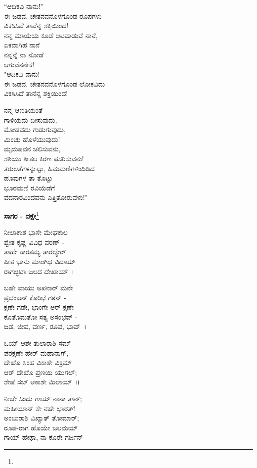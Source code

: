 “ಆದಿಕವಿ ನಾನು!”\\ಈ ಜಡವ, ಚೇತನವನೊಳಗೊಂಡ ರೂಪಗಳು\\ವಿಕಸಿಸಿವೆ ತಾವೆನ್ನ ಶಕ್ತಿಯಿಂದ!\\ನನ್ನ ಮಾಯೆಯ ಕೂಡೆ ಆಟವಾಡುವೆ ನಾನೆ,\\ಏಕವಾಗಿಹ ನಾನೆ\\ನನ್ನನ್ನೆ ನಾ ನೋಡೆ\\ಆಗುವೆನನೇಕ!\\

"ಆದಿಕವಿ ನಾನು!\\ಈ ಜಡವ, ಚೇತನವನೊಳಗೊಂಡ ಲೋಕವಿದು\\ವಿಕಸಿಸಿದೆ ತಾನೆನ್ನ ಶಕ್ತಿಯಿಂದ!

ನನ್ನ ಆಣತಿಯಂತೆ\\ಗಾಳಿಯದು ಬೀಸುವುದು,\\ಮೋಡವದು ಗುಡುಗುವುದು,\\ಮಿಂಚು ಹೊಳೆಯುವುದು!\\
 ಮೃದುಪವನ ಚಲಿಸುವನು,\\ಶಶಿಯು ಶೀತಲ ಕಿರಣ ಪಸರಿಸುವನು!\\ತರುಲತೆಗಳನ್ನುಟ್ಟು, ಹಿಮಮಣಿಗಳಿಂದಿಡಿದ\\ಹೂವುಗಳ ತಾ ತೊಟ್ಟು\\ಭೂರಮಣಿ ರವಿಯೆಡೆಗೆ\\ವದನಾರವಿಂದವನು ಎತ್ತಿತೋರುವಳು!"

\begin{center}
\textbf{ಸಾಗರ - ವಕ್ಷೇ}\footnote{}
\end{center}

ನೀಲಾಕಾಶ ಭಾಸೇ ಮೇಘಕುಲ\\ಶ್ವೇತ ಕೃಷ್ಣ ವಿವಿಧ ವರಣ್ -\\ತಾಹೇ ತಾರತಮ್ಯ ತಾರಲ್ಯೇರ್\\ಪೀತ ಭಾನು ಮಾಂಗಿಛ ವಿದಾಯ್\\ರಾಗಚ್ಛಟಾ ಜಲದ ದೇಖಾಯ್~।

ಬಹೇ ವಾಯು ಅಪನಾರ್ ಮನೇ\\ಪ್ರಭಂಜನ್ ಕೊರಿಛೆ ಗಠನ್ -\\ಕ್ಷಣೇ ಗಡೇ, ಭಾಂಗೇ ಆರ್ ಕ್ಷಣೇ -\\ಕೊತೊಮತೋ ಸತ್ಯ ಅಸಂಭವ್ -\\ಜಡ, ಜೀವ, ವರ್ಣ, ರೂಪ, ಭಾವ್~।

ಒಯ್ ಆಶೇ ತುಲಾರಾಶಿ ಸಮ್\\ಪರಕ್ಷಣೇ ಹೇರ್‌ ಮಹಾನಾಗ್,\\ದೇಖೊ ಸಿಂಹ ವಿಕಾಶೇ ವಿಕ್ರಮ್\\ಆರ್ ದೇಖೊ ಪ್ರಣಯಿ ಯುಗಲ್;\\ಶೇಷೆ ಸಬ್ ಆಕಾಶೇ ಮಿಲಾಯ್~॥

ನೀಚೇ ಸಿಂಧು ಗಾಯ್ ನಾನಾ ತಾನ್;\\ಮಹೀಯಾನ್ ಸೇ ನಹೇ ಭಾರತ್!\\ಅಂಬುರಾಶಿ ವಿಖ್ಯಾತ್ ತೋಮಾರ್;\\ರೂಪ-ರಾಗ ಹೊಯೇ ಜಲಮಯ್\\ಗಾಯ್ ಹೇಥಾ, ನಾ ಕೊರೇ ಗರ್ಜನ್

